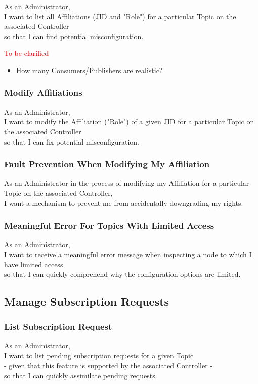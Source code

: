 As an Administrator,\\
I want to list all Affiliations (JID and "Role") for a particular Topic on the associated Controller \\
so that I can find potential misconfiguration.

\noindent\textcolor{red}{To be clarified}

\begin{itemize}
    \item How many Consumers/Publishers are realistic?
\end{itemize}


\subsubsection{Modify Affiliations}

As an Administrator,\\
I want to modify the Affiliation ("Role") of a given JID for a particular Topic on the associated Controller \\
so that I can fix potential misconfiguration.

\subsubsection{Fault Prevention When Modifying My Affiliation}

As an Administrator in the process of modifying my Affiliation for a particular Topic on the associated Controller,\\
I want a mechanism to prevent me from accidentally downgrading my rights.

\subsubsection{Meaningful Error For Topics With Limited Access}

As an Administrator,\\
I want to receive a meaningful error message when inspecting a node to which I have limited access \\
so that I can quickly comprehend why the configuration options are limited.

\subsection{Manage Subscription Requests}

\subsubsection{List Subscription Request}
As an Administrator,\\
I want to list pending subscription requests for a given Topic\\
- given that this feature is supported by the associated Controller -\\
so that I can quickly assimilate pending requests.

